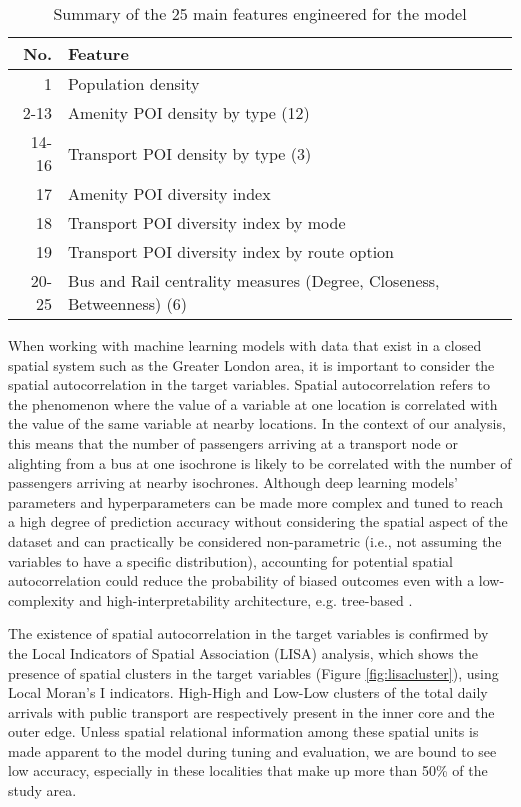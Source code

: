 \begin{table}[!ht]
    \centering
    \renewcommand{\arraystretch}{1.25}
    \begin{tabular}{|r||l|}
        \hline
        \rowcolor{lightgray}
        \textbf{No.} & \textbf{Feature} \\
        \hline
        1 & Population density \\
        2-13 & Amenity POI density by type (12) \\
        14-16 & Transport POI density by type (3) \\
        17 & Amenity POI diversity index \\
        18 & Transport POI diversity index by mode \\
        19 & Transport POI diversity index by route option \\
        20-25 & Bus and Rail centrality measures (Degree, Closeness, Betweenness) (6) \\
        \hline
    \end{tabular}
    \caption{Summary of the 25 main features engineered for the model}
    \label{tab:features}
\end{table}

When working with machine learning models with data that exist in a closed spatial system such as the Greater London area, it is important to consider the spatial autocorrelation in the target variables. Spatial autocorrelation refers to the phenomenon where the value of a variable at one location is correlated with the value of the same variable at nearby locations. In the context of our analysis, this means that the number of passengers arriving at a transport node or alighting from a bus at one isochrone is likely to be correlated with the number of passengers arriving at nearby isochrones. Although deep learning models' parameters and hyperparameters can be made more complex and tuned to reach a high degree of prediction accuracy without considering the spatial aspect of the dataset and can practically be considered non-parametric (i.e., not assuming the variables to have a specific distribution), accounting for potential spatial autocorrelation could reduce the probability of biased outcomes even with a low-complexity and high-interpretability architecture, e.g. tree-based \citep{meyerImportanceSpatialPredictor2019}.

The existence of spatial autocorrelation in the target variables is confirmed by the Local Indicators of Spatial Association (LISA) analysis, which shows the presence of spatial clusters in the target variables (Figure \ref{fig:lisacluster}), using Local Moran's I indicators. High-High and Low-Low clusters of the total daily arrivals with public transport are respectively present in the inner core and the outer edge. Unless spatial relational information among these spatial units is made apparent to the model during tuning and evaluation, we are bound to see low accuracy, especially in these localities that make up more than 50\% of the study area.  

